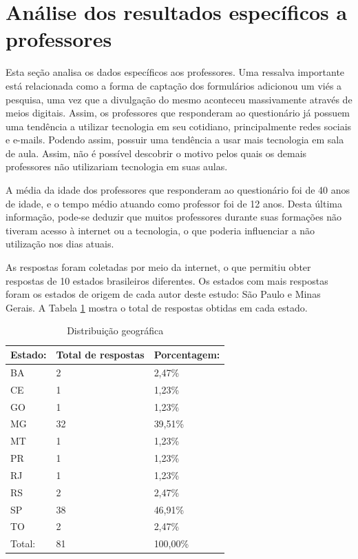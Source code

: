 \section{Análise dos resultados específicos a professores}

Esta seção analisa os dados específicos aos professores. Uma ressalva importante está relacionada como a forma de captação dos formulários adicionou um viés a pesquisa, uma vez que a divulgação do mesmo aconteceu massivamente através de meios digitais.  Assim, os professores que responderam ao questionário já possuem uma tendência a utilizar tecnologia em seu cotidiano, principalmente redes sociais e e-mails. Podendo assim, possuir uma tendência a usar mais tecnologia em sala de aula. Assim, não é possível descobrir o motivo pelos quais os demais professores não utilizariam tecnologia em suas aulas.

A média da idade dos professores que responderam ao questionário foi de 40 anos de idade, e o tempo médio atuando como professor foi de 12 anos. Desta última informação, pode-se deduzir que muitos professores durante suas formações não tiveram acesso à internet ou a tecnologia, o que poderia influenciar a não utilização nos dias atuais.

As respostas foram coletadas por meio da internet, o que permitiu obter respostas de 10 estados brasileiros diferentes. Os estados com mais respostas foram os estados de origem de cada autor deste estudo: São Paulo e Minas Gerais.
A Tabela \ref{tab:distribuicao_geografica} mostra o total de respostas obtidas em cada estado.

\bgroup
\def\arraystretch{1.5} %
\begin{table}[h]{} %
\centering
\begin{tabular}{ | p{3cm} | p{5cm}| p{5cm}| } \hline
\textbf{Estado:} & \textbf{Total de respostas} & \textbf{Porcentagem: } \\ \hline
BA & 2 & 2,47\% \\ \hline
CE & 1 & 1,23\% \\ \hline
GO & 1 & 1,23\% \\ \hline
MG & 32 & 39,51\% \\ \hline
MT & 1 & 1,23\% \\ \hline
PR & 1 & 1,23\% \\ \hline
RJ & 1 & 1,23\% \\ \hline
RS & 2 & 2,47\% \\ \hline
SP & 38 & 46,91\% \\ \hline
TO & 2 & 2,47\% \\ \hline
Total: & 81 & 100,00\% \\ \hline
\end{tabular}
\caption{Distribuição geográfica}
\label{tab:distribuicao_geografica}
\end{table}
\egroup

